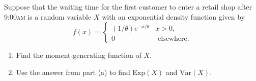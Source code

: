 \begin{problem}
Suppose that the waiting time for the first customer to enter a retail shop after 9:00\textsc{am} is a random variable $X$ with an exponential density function given by
    \[
        f(x) = \left\{ \begin{matrix} (1/\theta ) e^{-x/\theta} & x > 0 , \\ 
        0 & \text{ elsewhere.} \end{matrix} \right.
    \]
    \begin{enumerate}[label=\alph*)]
    \item Find the moment-generating function of $X$.
    \item Use the answer from part (a) to find $\mathrm{Exp} (X)$ and $\mathrm{Var} (X)$.
    \end{enumerate}
\end{problem}

